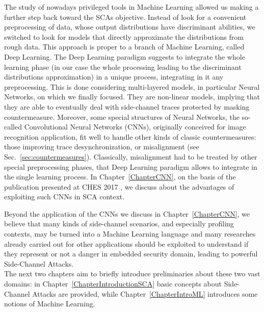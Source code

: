 The study of nowadays privileged tools in Machine Learning allowed us making a further step back toward the SCAs objective. Instead of look for a convenient preprocessing of data, whose output distributions have discriminant abilities, we switched to look for models that directly approximate the distributions from rough data. This approach is proper to a branch of Machine Learning, called Deep Learning. The Deep Learning paradigm suggests to integrate the whole learning phase (in our case the whole processing leading to the discriminant distributions approximation) in a unique process, integrating in it any preprocessing. This is done considering multi-layered models, in particular Neural Networks, on which we finally focused. They are non-linear models, implying that they are able to eventually deal with side-channel traces protected by masking countermeasure. Moreover, some special structures of Neural Networks, the so-called Convolutional Neural Networks (CNNs), originally conceived for image recognition application, fit well to handle other kinds of classic countermeasures: those improving trace desynchronization, or misalignment (see Sec.~\ref{sec:countermeasures}). Classically, misalignment had to be treated by other special preprocessing phases, that Deep Learning paradigm allows to integrate in the single learning process. In Chapter~\ref{ChapterCNN}, on the basis of the publication presented at CHES 2017 \cite{DBLP:conf/ches/CagliDP17}, we discuss about the advantages of exploiting such CNNs in SCA context.

Beyond the application of the CNNs we discuss in Chapter~\ref{ChapterCNN}, we believe that many kinds of side-channel scenarios, and especially profiling contexts, may be turned into a Machine Learning language and many researches already carried out for other applications should be exploited to understand if they represent or not a danger in embedded security domain, leading to powerful Side-Channel Attacks. \\
%



The next two chapters aim to briefly introduce preliminaries about these two vast domains: in Chapter~\ref{ChapterIntroductionSCA} basic concepts about Side-Channel Attacks are provided, while Chapter~\ref{ChapterIntroML} introduces some notions of Machine Learning.
